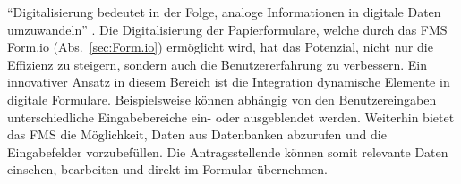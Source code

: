 ``Digitalisierung bedeutet in der Folge, analoge Informationen in digitale Daten umzuwandeln'' \cite[S.~90]{markus_auf_2022}. Die Digitalisierung der Papierformulare, welche durch das FMS Form.io (Abs.~\ref{sec:Form.io}) ermöglicht wird, hat das Potenzial, nicht nur die Effizienz zu steigern, sondern auch die Benutzererfahrung zu verbessern. Ein innovativer Ansatz in diesem Bereich ist die Integration dynamische Elemente in digitale Formulare. Beispielsweise können abhängig von den Benutzereingaben unterschiedliche Eingabebereiche ein- oder ausgeblendet werden. Weiterhin bietet das FMS die Möglichkeit, Daten aus Datenbanken abzurufen und die Eingabefelder vorzubefüllen. Die Antragsstellende können somit relevante Daten einsehen, bearbeiten und direkt im Formular übernehmen.
